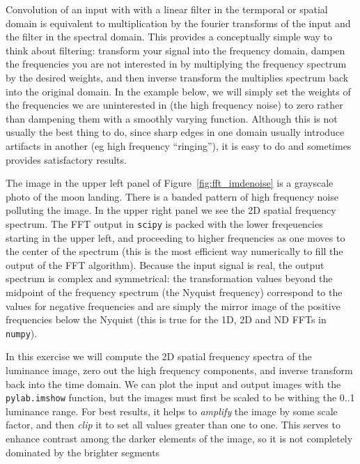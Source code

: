 Convolution of an input with with a linear filter in the termporal or
spatial domain is equivalent to multiplication by the fourier
transforms of the input and the filter in the spectral domain.  This
provides a conceptually simple way to think about filtering: transform
your signal into the frequency domain, dampen the frequencies you are
not interested in by multiplying the frequency spectrum by the desired
weights, and then inverse transform the multiplies spectrum back into
the original domain.  In the example below, we will simply set the
weights of the frequencies we are uninterested in (the high frequency
noise) to zero rather than dampening them with a smoothly varying
function.  Although this is not usually the best thing to do, since
sharp edges in one domain usually introduce artifacts in another (eg
high frequency ``ringing''), it is easy to do and sometimes provides
satisfactory results.

The image in the upper left panel of Figure~\ref{fig:fft_imdenoise} is
a grayscale photo of the moon landing.  There is a banded pattern of
high frequency noise polluting the image.  In the upper right panel we
see the 2D spatial frequency spectrum.  The FFT output in
\texttt{scipy} is packed with the lower freqeuencies starting in the
upper left, and proceeding to higher frequencies as one moves to the
center of the spectrum (this is the most efficient way numerically to
fill the output of the FFT algorithm).  Because the input signal is
real, the output spectrum is complex and symmetrical: the
transformation values beyond the midpoint of the frequency spectrum
(the Nyquist frequency) correspond to the values for negative
frequencies and are simply the mirror image of the positive
frequencies below the Nyquist (this is true for the 1D, 2D and ND FFTs
in \texttt{numpy}).

In this exercise we will compute the 2D spatial frequency spectra of
the luminance image, zero out the high frequency components, and
inverse transform back into the time domain.  We can plot the input
and output images with the \texttt{pylab.imshow} function, but the
images must first be scaled to be withing the 0..1 luminance range.
For best results, it helps to \textit{amplify} the image by some scale
factor, and then \textit{clip} it to set all values greater than one
to one.  This serves to enhance contrast among the darker elements of
the image, so it is not completely dominated by the brighter segments



